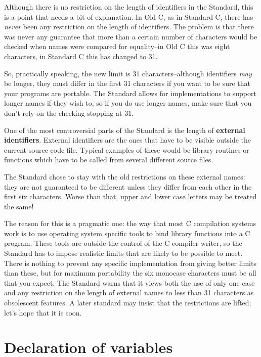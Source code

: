    Although there is no restriction on the length of identifiers in the
    Standard, this is a point that needs a bit of explanation. In Old C,
    as in Standard C, there has \textit{never} been any restriction on
    the length of identifiers. The problem is that there was never any
    guarantee that more than a certain number of characters would be checked
    when names were compared for equality--in Old C this was eight
    characters, in Standard C this has changed to 31.


   So, practically speaking, the new limit is
    31 characters--although identifiers \textit{may} be longer, they
    must differ in the first 31 characters if you want to be sure that
    your programs are portable. The Standard allows for implementations to
    support longer names if they wish to, so if you do use longer names, make
    sure that you don't rely on the checking stopping at 31.


   One of the most controversial parts of the Standard is the length of
    \textbf{external identifiers}. External identifiers are the ones that
    have to be visible outside the current source code file. Typical examples
    of these would be library routines or functions which have to be called
    from several different source files.


   The Standard chose to stay with the old restrictions on these external
    names: they are not guaranteed to be different unless they differ from
    each other in the first six characters. Worse than that, upper and lower
    case letters may be treated the same!


   The reason for this is a pragmatic one: the way that most
    C compilation systems work is to use operating system specific tools
    to bind library functions into a C program. These tools are outside
    the control of the C compiler writer, so the Standard has to impose
    realistic limits that are likely to be possible to meet. There is nothing
    to prevent any specific implementation from giving better limits than
    these, but for maximum portability the six monocase characters must be
    all that you expect. The Standard warns that it views both the use of
    only one case and any restriction on the length of external names to less
    than 31 characters as obsolescent features. A later standard may
    insist that the restrictions are lifted; let's hope that it is soon.


  

 
        \section{Declaration of variables}
        

